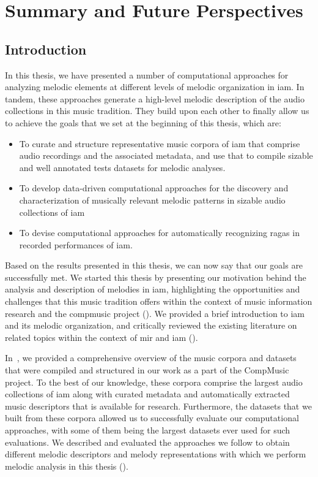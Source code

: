 \chapter{Summary and Future Perspectives}
\label{chap:summary_future_work}

\section{Introduction}
\label{sec:summary_thesis}

In this thesis, we have presented a number of computational approaches for analyzing melodic elements at different levels of melodic organization in \gls{iam}. In tandem, these approaches generate a high-level melodic description of the audio collections in this music tradition. They build upon each other to finally allow us to achieve the goals that we set at the beginning of this thesis, which are: 

\begin{itemize}
	\item To curate and structure representative music corpora of \gls{iam} that comprise audio recordings and the associated metadata, and use that to compile sizable and well annotated tests datasets for melodic analyses.
	\item To develop data-driven computational approaches for the discovery and characterization of musically relevant melodic patterns in sizable audio collections of \gls{iam}
	\item To devise computational approaches for automatically recognizing \glspl{raga} in recorded performances of \gls{iam}.
\end{itemize}

Based on the results presented in this thesis, we can now say that our goals are successfully met. We started this thesis by presenting our motivation behind the analysis and description of melodies in \gls{iam}, highlighting the opportunities and challenges that this music tradition offers within the context of music information research and the compmusic project (). We provided a brief introduction to \gls{iam} and its melodic organization,  and critically reviewed the existing literature on related topics within the context of \gls{mir} and \gls{iam} ().

In~, we provided a comprehensive overview of the music corpora and datasets that were compiled and structured in our work as a part of the CompMusic project. To the best of our knowledge, these corpora comprise the largest audio collections of \gls{iam} along with curated metadata and automatically extracted music descriptors that is available for research. Furthermore, the datasets that we built from these corpora allowed us to successfully evaluate our computational approaches, with some of them being the largest datasets ever used for such evaluations. We described and evaluated the approaches we follow to obtain different melodic descriptors and melody representations with which we perform melodic analysis in this thesis ().

